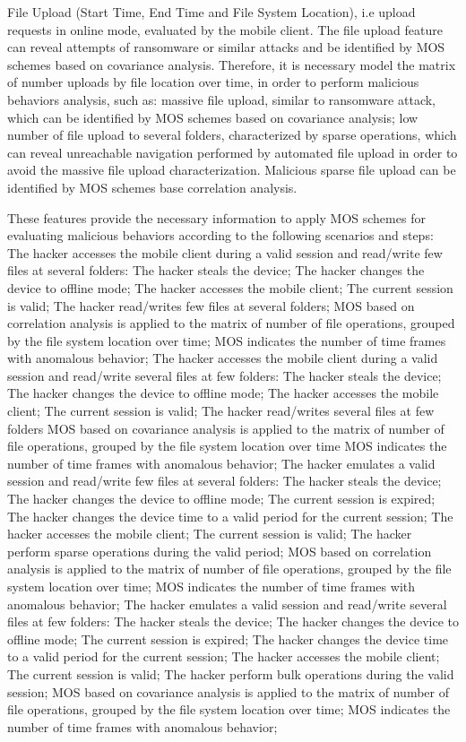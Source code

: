 \documentclass[twocolumn]{svjour3}          	%
\begin{document}
File Upload (Start Time, End Time and File System Location), i.e upload requests in online mode, evaluated by the mobile client. The file upload feature can reveal attempts of ransomware or similar attacks and be identified by MOS schemes based on covariance analysis. Therefore, it is necessary model the matrix of number uploads by file location over time, in order to perform malicious behaviors analysis, such as:
massive file upload, similar to ransomware attack, which can be identified by MOS schemes based on covariance analysis; 
low number of file upload to several folders, characterized by sparse operations, which can reveal unreachable navigation performed by automated file upload in order to avoid the massive file upload characterization. Malicious sparse file upload can be identified by MOS schemes base correlation analysis.

These features provide the necessary information to apply MOS schemes for evaluating malicious behaviors according to the following scenarios and steps:
The hacker accesses the mobile client during a valid session and read/write few files at several folders:
The hacker steals the device;
The hacker changes the device to offline mode;
The hacker accesses the mobile client;
The current session is valid;
The hacker read/writes few files at several folders;
MOS based on correlation analysis is applied to the matrix of number of file operations, grouped by the file system location over time;
MOS indicates the number of time frames with anomalous behavior;
The hacker accesses the mobile client during a valid session and read/write several files at few folders:
The hacker steals the device;
The hacker changes the device to offline mode;
The hacker accesses the mobile client;
The current session is valid;
The hacker read/writes several files at few folders
MOS based on covariance analysis is applied to the matrix of number of file operations, grouped by the file system location over time
MOS indicates the number of time frames with anomalous behavior;
The hacker emulates a valid session and read/write few files at several folders: 
The hacker steals the device;
The hacker changes the device to offline mode;
The current session is expired;
The hacker changes the device time to a valid period for the current session;
The hacker accesses the mobile client;
The current session is valid;
The hacker perform sparse operations during the valid period;
MOS based on correlation analysis is applied to the matrix of number of file operations, grouped by the file system location over time;
MOS indicates the number of time frames with anomalous behavior;
The hacker emulates a valid session and read/write several files at few folders: 
The hacker steals the device;
The hacker changes the device to offline mode;
The current session is expired;
The hacker changes the device time to a valid period for the current session;
The hacker accesses the mobile client;
The current session is valid;
The hacker perform bulk operations during the valid session;
MOS based on covariance analysis is applied to the matrix of number of file operations, grouped by the file system location over time;
MOS indicates the number of time frames with anomalous behavior;
\end{document}
